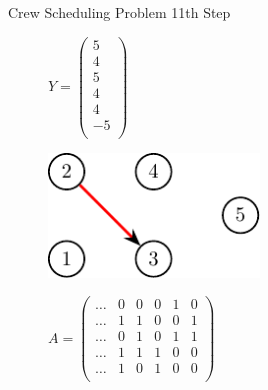 \documentclass{beamer}
\begin{document}
\begin{frame}{Crew Scheduling Problem}
    11th Step
    \begin{figure}[!htb]
        \begin{minipage}{0.48\textwidth}
            \centering
            $Y = \begin{pmatrix} 5\\ 4\\ 5\\ 4\\ 4\\ -5\\ \end{pmatrix}$
                \begin{center}
                {
                \centering
                \includegraphics[width=0.5\textwidth]{graph6.pdf}
                }
                \end{center}
            \end{minipage}
        \begin{minipage}{0.48\textwidth}
            $A = \begin{pmatrix}
                \ldots & 0 & 0 & 0 & 1 & 0 \\
                \ldots & 1 & 1 & 0 & 0 & 1 \\
                \ldots & 0 & 1 & 0 & 1 & 1 \\
                \ldots & 1 & 1 & 1 & 0 & 0 \\
                \ldots & 1 & 0 & 1 & 0 & 0 \\
            \end{pmatrix}$
        \end{minipage}
    \end{figure}
\end{frame}
\end{document}
